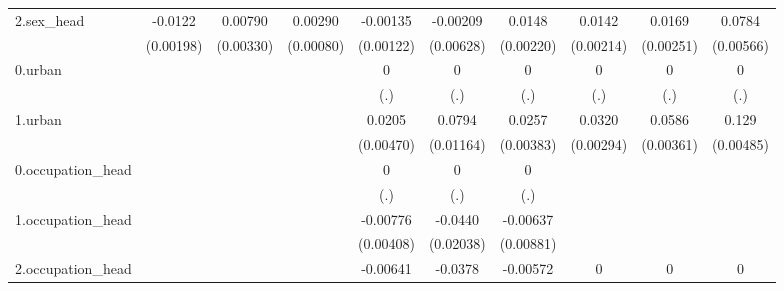 \begin{table}[htbp]
{\begin{tabular}{l*{9}{c}}
2.sex_head  &     -0.0122\sym{***}&     0.00790\sym{**} &     0.00290\sym{***}&    -0.00135         &    -0.00209         &      0.0148\sym{***}&      0.0142\sym{***}&      0.0169\sym{***}&      0.0784\sym{***}\\
            &   (0.00198)         &   (0.00330)         &   (0.00080)         &   (0.00122)         &   (0.00628)         &   (0.00220)         &   (0.00214)         &   (0.00251)         &   (0.00566)         \\
0.urban     &                     &                     &                     &           0         &           0         &           0         &           0         &           0         &           0         \\
            &                     &                     &                     &         (.)         &         (.)         &         (.)         &         (.)         &         (.)         &         (.)         \\
1.urban     &                     &                     &                     &      0.0205\sym{***}&      0.0794\sym{***}&      0.0257\sym{***}&      0.0320\sym{***}&      0.0586\sym{***}&       0.129\sym{***}\\
            &                     &                     &                     &   (0.00470)         &   (0.01164)         &   (0.00383)         &   (0.00294)         &   (0.00361)         &   (0.00485)         \\
0.occupation_head&                     &                     &                     &           0         &           0         &           0         &                     &                     &                     \\
            &                     &                     &                     &         (.)         &         (.)         &         (.)         &                     &                     &                     \\
1.occupation_head&                     &                     &                     &    -0.00776\sym{*}  &     -0.0440\sym{**} &    -0.00637         &                     &                     &                     \\
            &                     &                     &                     &   (0.00408)         &   (0.02038)         &   (0.00881)         &                     &                     &                     \\
2.occupation_head&                     &                     &                     &    -0.00641\sym{***}&     -0.0378\sym{***}&    -0.00572\sym{*}  &           0         &           0         &           0         \\

\end{tabular}}
\end{table}
